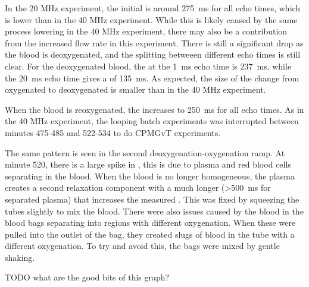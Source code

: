 In the 20 MHz experiment, the initial \Ttwo is around \SI{275}{ms} for all echo times, which is lower than in the 40 MHz experiment.
While this is likely caused by the same process lowering \Ttwo in the 40 MHz experiment, there may also be a contribution from the increased flow rate in this experiment.
There is still a significant drop as the blood is deoxygenated, and the splitting betweeen different echo times is still clear.
For the deoxygenated blood, the \Ttwo at the \SI{1}{ms} echo time is \SI{237}{ms}, while the \SI{20}{ms} echo time gives a \Ttwo of \SI{135}{ms}.
As expected, the size of the change from oxygenated to deoxygenated is smaller than in the 40 MHz experiment.

When the blood is reoxygenated, the \Ttwo increases to \SI{250}{ms} for all echo times.
As in the 40 MHz experiment, the looping batch experiments was interrupted between minutes 475-485 and 522-534 to do CPMGvT experiments.

The same pattern is seen in the second deoxygenation-oxygenation ramp.
At minute 520, there is a large spike in \Ttwo, this is due to plasma and red blood cells separating in the blood.
When the blood is no longer homogeneous, the plasma creates a second relaxation component with a much longer \Ttwo (\SI{>500}{ms} for separated plasma) that increases the measured \Ttwo.
This was fixed by squeezing the tubes slightly to mix the blood.
There were also issues caused by the blood in the blood bags separating into regions with different oxygenation.
When these were pulled into the outlet of the bag, they created slugs of blood in the tube with a different oxygenation.
To try and avoid this, the bags were mixed by gentle shaking.

TODO what are the good bits of this graph?

